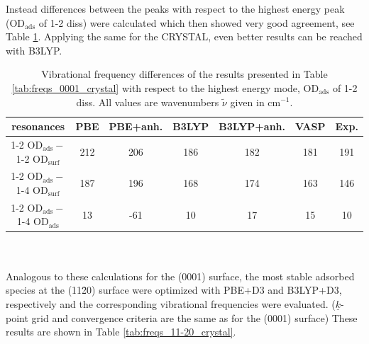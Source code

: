 \documentclass[11pt,DIV=13,BCOR=5mm,a4paper,headinclude]{scrbook}
\renewcommand{\vec}[1]{\underline{#1}}
\begin{document}
Instead differences between the peaks with respect to the highest energy peak (OD$_\textrm{ads}$ of 1-2 diss) were calculated which then showed very good agreement, see Table \ref{tab:freqs_0001_crystal-relative}.
Applying the same for the CRYSTAL, even better results can be reached with B3LYP.
\begin{table}[!h]
  \centering
  \caption{Vibrational frequency differences of the results presented in Table \ref{tab:freqs_0001_crystal} with respect to the highest energy mode, OD$_\textrm{ads}$ of 1-2 diss.
All values are wavenumbers $\tilde{\nu}$ given in cm$^{-1}$.}
  \begin{tabular}{c|cc|cc|c|c}
  \toprule
   resonances& PBE & PBE+anh. & B3LYP & B3LYP+anh. &VASP&Exp.\\\midrule
  1-2 OD$_\textrm{ads}-$1-2 OD$_\textrm{surf}$&212 &206 &186 &182 &181 &191 \\
  1-2 OD$_\textrm{ads}-$1-4 OD$_\textrm{surf}$&187 &196 &168 &174 &163 &146 \\
  1-2 OD$_\textrm{ads}-$1-4 OD$_\textrm{ads}$ &13 &-61 &10 &17 &15 &10 \\\bottomrule
    \end{tabular}
  \label{tab:freqs_0001_crystal-relative}
\end{table}
\\\\
Analogous to these calculations for the (0001) surface, the most stable adsorbed species at the (11\=20) surface were optimized with PBE+D3 and B3LYP+D3, respectively and the corresponding vibrational frequencies were evaluated.
($\vec{k}$-point grid and convergence criteria are the same as for the (0001) surface)
These results are shown in Table \ref{tab:freqs_11-20_crystal}.
\end{document}
